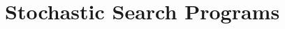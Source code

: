 
\chapter{Stochastic Search Programs}
\label{chapter:stochastic}

\clearpage


\clearpage


\clearpage


\clearpage


\clearpage

